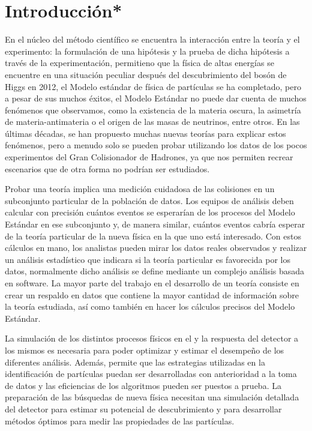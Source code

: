 \chapter*{Introducción*}
En el núcleo del método científico se encuentra la interacción entre la teoría y el experimento: la formulación de una hipótesis y la prueba de dicha hipótesis a través de la experimentación, permitieno que la física de altas energías se encuentre en una situación peculiar después del descubrimiento del bosón de Higgs en 2012, el Modelo estándar de física de partículas se ha completado, pero a pesar de sus muchos éxitos, el Modelo Estándar no puede dar cuenta de muchos fenómenos que observamos, como la existencia de la materia oscura, la asimetría de materia-antimateria o el origen de las masas de neutrinos, entre otros. En las últimas décadas, se han propuesto muchas nuevas teorías para explicar estos fenómenos, pero a menudo solo se pueden probar utilizando los datos de los pocos experimentos del Gran Colisionador de Hadrones, ya que nos permiten recrear escenarios que de otra forma no podrían ser estudiados. 

Probar una teoría implica una medición cuidadosa de las colisiones en un subconjunto particular de la población de datos. Los equipos de análisis deben calcular con precisión cuántos eventos se esperarían de los procesos del Modelo Estándar en ese subconjunto y, de manera similar, cuántos eventos cabría esperar de la teoría particular de la nueva física en la que uno está interesado. Con estos cálculos en mano, los analistas pueden mirar los datos reales observados y realizar un análisis estadístico que indicara si la teoría particular es favorecida por los datos, normalmente dicho análisis se define mediante un complejo análisis basada en software. La mayor parte del trabajo en el desarrollo de un teoría consiste en crear un respaldo en datos que contiene la mayor cantidad de información sobre la teoría estudiada, así como también en hacer los cálculos precisos del Modelo Estándar.


La simulación de los distintos procesos físicos en el \LHC y la respuesta del detector a los mismos es necesaria para poder optimizar y estimar el desempeño de los diferentes análisis. Además, permite que las estrategias utilizadas en la identificación de partículas puedan ser desarrolladas con anterioridad a la toma de datos y las eficiencias de los algoritmos pueden ser puestos a prueba. La preparación de las búsquedas de nueva física necesitan una simulación detallada del detector para estimar su potencial de descubrimiento y para desarrollar métodos óptimos para medir las propiedades de las partículas.

